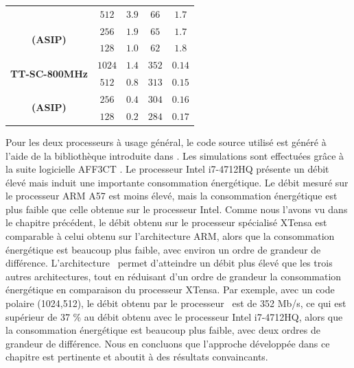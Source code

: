 \begin{table}
\begin{tabular}{ccccc}
                                                & $512$    & $3.9$  & $66$  & $1.7$ \\

     \multirow{2}{*}{\bf (ASIP)}                & $256$    & $1.9$  & $65$  & $1.7$ \\

                                                & $128$    & $1.0$  & $62$  & $1.8$ \\

    \midrule

    \multirow{2}{*}{\bf TT-SC-800MHz}            & $1024$  & $1.4$   & $352$ & $0.14$   \\ %

                                                & $512$    & $0.8$  & $313$ & $0.15$   \\ %

     \multirow{2}{*}{\bf (ASIP)}                & $256$    & $0.4$  & $304$ & $0.16$   \\ %

                                                & $128$    & $0.2$  & $284$ & $0.17$   \\ %

    \bottomrule
  \end{tabular}
\end{table}

Pour les deux processeurs à usage général, le code source utilisé est généré à l'aide de la bibliothèque introduite dans \cite{cassagne_efficient_2015}. Les simulations sont effectuées grâce à la suite logicielle AFF3CT \cite{aff3ct_aff3ct:_2016}. Le processeur Intel i7-4712HQ présente un débit élevé mais induit une importante consommation énergétique. Le débit mesuré sur le processeur ARM A57 est moins élevé, mais la consommation énergétique est plus faible que celle obtenue sur le processeur Intel. Comme nous l'avons vu dans le chapitre précédent, le débit obtenu sur le processeur spécialisé XTensa est comparable à celui obtenu sur l'architecture ARM, alors que la consommation énergétique est beaucoup plus faible, avec environ un ordre de grandeur de différence. L'architecture \TTSC~permet d'atteindre un débit plus élevé que les trois autres architectures, tout en réduisant d'un ordre de grandeur la consommation énergétique en comparaison du processeur XTensa. Par exemple, avec un code polaire (1024,512), le débit obtenu par le processeur \TTSC~est de 352 Mb/s, ce qui est supérieur de 37 \% au débit obtenu avec le processeur Intel i7-4712HQ, alors que la consommation énergétique est beaucoup plus faible, avec deux ordres de grandeur de différence. Nous en concluons que l'approche développée dans ce chapitre est pertinente et aboutit à des résultats convaincants.

